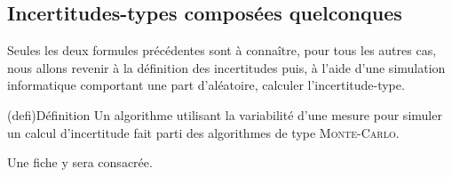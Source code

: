 \documentclass[../main/main.tex]{subfiles}
\begin{document}
\subsection{Incertitudes-types composées quelconques}
Seules les deux formules précédentes sont à connaître, pour tous les autres cas,
nous allons revenir à la définition des incertitudes puis, à l'aide d'une
simulation informatique comportant une part d'aléatoire, calculer
l'incertitude-type.
\begin{tcb}(defi){Définition}
	Un algorithme utilisant la variabilité d'une mesure pour simuler un calcul
	d'incertitude fait parti des algorithmes de type \textsc{Monte-Carlo}.
\end{tcb}
Une fiche y sera consacrée.
\end{document}

